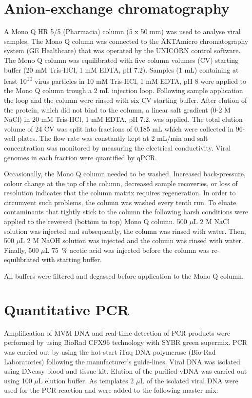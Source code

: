 \section{Anion-exchange chromatography}
A Mono Q HR 5/5 (Pharmacia) column (5 x 50 mm) was used to analyse viral samples. The Mono Q column was connected to the ÄKTAmicro chromatography system (GE Healthcare) that was operated by the UNICORN control software. The Mono Q column was equilibrated with five column volumes (CV) starting buffer (20 mM Tris-HCl, 1 mM EDTA, pH 7.2). Samples (1 mL) containing at least 10\textsuperscript{10} virus particles in 10 mM Tris-HCl, 1 mM EDTA, pH 8 were applied to the Mono Q column trough a 2 mL injection loop. Following sample application the loop and the column were rinsed with six CV starting buffer. After elution of the protein, which did not bind to the column, a linear salt gradient (0-2 M NaCl) in 20 mM Tris-HCl, 1 mM EDTA, pH 7.2, was applied. The total elution volume of 24 CV was split into fractions of 0.185 mL which were collected in 96-well plates. The flow rate was constantly kept at 2 mL/min and salt concentration was monitored by measuring the electrical conductivity. Viral genomes in each fraction were quantified by qPCR.  

Occasionally, the Mono Q column needed to be washed. Increased back-pressure, colour change at the top of the column, decreased sample recoveries, or loss of resolution indicates that the column matrix requires regeneration. In order to circumvent such problems, the column was washed every tenth run. To eluate contaminants that tightly stick to the column the following harsh conditions were applied to the reversed (bottom to top) Mono Q column. 500 $\mu$L 2 M NaCl solution was injected and subsequently, the column was rinsed with water. Then, 500 $\mu$L 2 M NaOH solution was injected and the column was rinsed with water. Finally, 500 $\mu$L 75~\% acetic acid was injected before the column was re-equilibrated with starting buffer.             

All buffers were filtered and degassed before application to the Mono Q column.



\section{Quantitative PCR}
Amplification of MVM DNA and real-time detection of PCR products were performed by using BioRad CFX96 technology with SYBR green supermix. PCR was carried out by using the hot-start iTaq\textsuperscript{\texttrademark} DNA polymerase (Bio-Rad Laboratories) following the manufacturer’s guide-lines. Viral DNA was isolated using DNeasy blood and tissue kit. Elution of the purified vDNA was carried out using 100 $\mu$L elution buffer. As templates 2 $\mu$L of the isolated viral DNA were used for the PCR reaction and were added to the following master mix:\\

